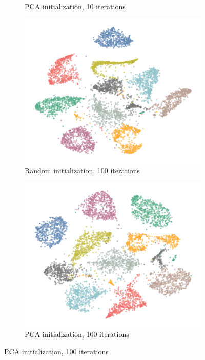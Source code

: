 \begin{figure}[tbp]
\begin{subfigure}{.45\linewidth}
    \caption{PCA initialization, 10 iterations}
  \end{subfigure}
  \par\bigskip
  \begin{subfigure}{.45\linewidth}
    \centering
    \includegraphics[width=\linewidth]{img/random_100_iters-1}
    \caption{Random initialization, 100 iterations}
  \end{subfigure}
  \begin{subfigure}{.45\linewidth}
    \centering
    \includegraphics[width=\linewidth]{img/pca_100_iters-1}
    \caption{PCA initialization, 100 iterations}

\end{subfigure}
\end{figure}
